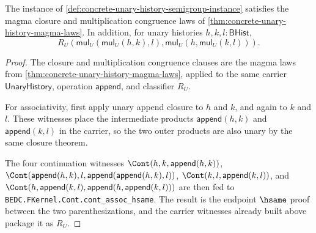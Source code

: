 \begin{theorem}
\label{thm:concrete-unary-history-semigroup-laws}
The instance of \autoref{def:concrete-unary-history-semigroup-instance}
satisfies the magma closure and multiplication congruence laws of
\autoref{thm:concrete-unary-history-magma-laws}. In addition, for unary
histories $h,k,l:\mathsf{BHist}$,
$$
R_U(\mathsf{mul}_U(\mathsf{mul}_U(h,k),l),
\mathsf{mul}_U(h,\mathsf{mul}_U(k,l))).
$$
\end{theorem}
\begin{proof}
The closure and multiplication congruence clauses are the magma laws from
\autoref{thm:concrete-unary-history-magma-laws}, applied to the same carrier
$\mathsf{UnaryHistory}$, operation $\mathsf{append}$, and classifier $R_U$.

For associativity, first apply unary append closure to $h$ and $k$, and again
to $k$ and $l$. These witnesses place the intermediate products
$\mathsf{append}(h,k)$ and $\mathsf{append}(k,l)$ in the carrier, so the two
outer products are also unary by the same closure theorem.

The four continuation witnesses
$\Cont(h,k,\mathsf{append}(h,k))$,
$\Cont(\mathsf{append}(h,k),l,\mathsf{append}(\mathsf{append}(h,k),l))$,
$\Cont(k,l,\mathsf{append}(k,l))$, and
$\Cont(h,\mathsf{append}(k,l),\mathsf{append}(h,\mathsf{append}(k,l)))$
are then fed to \texttt{BEDC.FKernel.Cont.cont\_assoc\_hsame}. The result is
the endpoint $\hsame$ proof between the two parenthesizations, and the carrier
witnesses already built above package it as $R_U$.
\end{proof}

